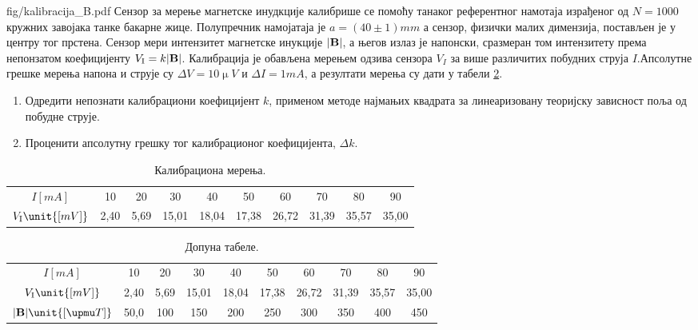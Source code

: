 \begin{slikaDesno}{fig/kalibracija_B.pdf}
\PID
Сензор за мерење магнетске инудкције калибрише се помоћу танаког референтног намотаја израђеног од $N = 1000$ 
кружних завојака танке бакарне жице. Полупречник намојатаја је $a = (40\pm 1)\unit{mm}$ а сензор, физички малих димензија, постављен 
је у центру тог прстена. Сензор мери интензитет магнетске инукције $|\bf{B}|$, а његов излаз је напонски, сразмеран том интензитету
према непонзатом коефицијенту $V_{\rm I} = k |\bf{B}|$. Калибрација је обављена мерењем одзива сензора $V_I$ за више различитих 
побудних струја $I$.Апсолутне грешке мерења напона и струје су $\Delta V = 10\unit{\upmu V}$ и $\Delta I = 1\unit{mA}$, а 
резултати мерења су дати у табели \ref{tab:\ID}.
\end{slikaDesno}
\begin{enumerate}[label=(\alph*)]
    \item Одредити непознати калибрациони коефицијент $k$, применом методе најмањих квадрата за линеаризовану теоријску зависност 
    поља од побудне струје.
    \item Проценити апсолутну грешку тог калибрационог коефицијента, $\Delta k$.
\end{enumerate}
\begin{table}[ht!]
    \centering
    \begin{tabular}{c||ccccccccc} 
        \hline
        $I\unit{[mA]}$ & 10 & 20 & 30 & 40 & 50 & 60 & 70 & 80 & 90 \\
        $V_{\rm I}\unit{[mV]}$ & 2,40 & 5,69 & 15,01 & 18,04 & 17,38 & 26,72 & 31,39 & 35,57 & 35,00 \\
        \hline
    \end{tabular}
    \caption{Калибрациона мерења.}
    \label{tab:\ID}
\end{table}

\RESENJE

\begin{table}[b!]
    \centering
    \begin{tabular}{c||ccccccccc} 
        \hline
        $I\unit{[mA]}$ & 10 & 20 & 30 & 40 & 50 & 60 & 70 & 80 & 90 \\
        $V_{\rm I}\unit{[mV]}$ & 2,40 & 5,69 & 15,01 & 18,04 & 17,38 & 26,72 & 31,39 & 35,57 & 35,00 \\ 
        $|{\bf B}|\unit{[\upmu T]}$ & 50,0 & 100 & 150 & 200 & 250 & 300 & 350 & 400 & 450   \\ 
        \hline
    \end{tabular}
    \caption{Допуна табеле.}
    \label{tab:\ID}
\end{table}

